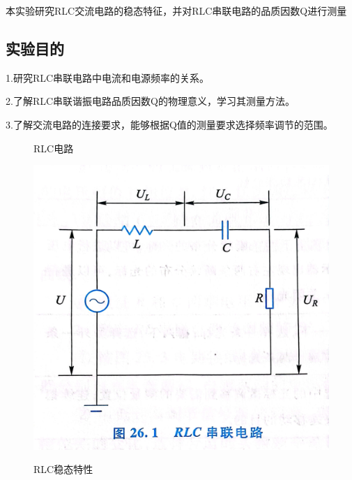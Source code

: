 \documentclass{ctexart}
\begin{document}
  本实验研究RLC交流电路的稳态特征，并对RLC串联电路的品质因数Q进行测量

  \subsection{实验目的}
  1.\quad 研究RLC串联电路中电流和电源频率的关系。

  2.\quad 了解RLC串联谐振电路品质因数Q的物理意义，学习其测量方法。
  
  3.\quad 了解交流电路的连接要求，能够根据Q值的测量要求选择频率调节的范围。

\begin{figure}[H]
  \begin{minipage}[H]{0.4\textwidth}\label{rlcdianlu}
  \centering
  \caption{RLC电路}
  \includegraphics[width=\textwidth]{RLCdianlu.jpg}
  \end{minipage}
  \hfill
  \begin{minipage}[H]{0.4\textwidth}\label{rlcwentaitexing}
  \centering
  \caption{RLC稳态特性}

\end{minipage}
\end{figure}
\end{document}
